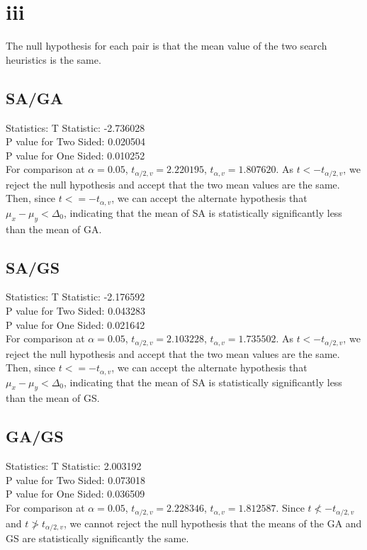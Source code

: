 \documentclass[12pt]{article}
\begin{document}
\section{iii}
The null hypothesis for each pair is that the mean value of the two search heuristics is the same.

\subsection{SA/GA}
Statistics: T Statistic: -2.736028\\
P value for Two Sided: 0.020504\\
P value for One Sided: 0.010252\\

For comparison at $\alpha = 0.05$, $t_{\alpha/2,v} = 2.220195$, $t_{\alpha, v}  = 1.807620$. As $t < -t_{\alpha/2,v}$, we reject the null hypothesis and accept that the two mean values are the same. Then, since $t <= -t_{\alpha, v}$, we can accept the alternate hypothesis that $\mu_x - \mu_y < \Delta_0$, indicating that the mean of SA is statistically significantly less than the mean of GA.


\subsection{SA/GS}
Statistics: T Statistic: -2.176592\\
P value for Two Sided: 0.043283\\
P value for One Sided: 0.021642\\

For comparison at $\alpha = 0.05$, $t_{\alpha/2,v} = 2.103228$, $t_{\alpha, v}  = 1.735502$. As $t < -t_{\alpha/2,v}$, we reject the null hypothesis and accept that the two mean values are the same. Then, since $t <= -t_{\alpha, v}$, we can accept the alternate hypothesis that $\mu_x - \mu_y < \Delta_0$, indicating that the mean of SA is statistically significantly less than the mean of GS.

\subsection{GA/GS}
Statistics: T Statistic: 2.003192\\
P value for Two Sided: 0.073018\\
P value for One Sided: 0.036509\\

For comparison at $\alpha = 0.05$, $t_{\alpha/2,v} = 2.228346$, $t_{\alpha, v}  = 1.812587$. Since $t \nless -t_{\alpha/2,v}$ and $t \ngtr t_{\alpha/2,v}$, we cannot reject the null hypothesis that the means of the GA and GS are statistically significantly the same.
\end{document}
